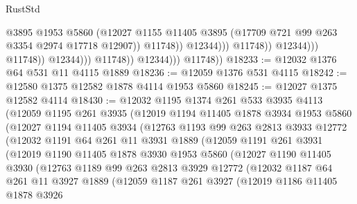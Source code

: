 \begin{lexlean}{RustStd}
\begin{coremodule}
{\begin{coremodule}
{{{{{{{{{{{{{{{{{{{{{{{{{{{{{                                                @3895
                                                @1953
                                                @5860
                                                (@12027
                                                  @1155
                                                  @11405
                                                  @3895
                                                  (@17709 @721 @99 @263 @3354 @2974 @17718 @12907))
                                                @11748))
                                            @12344)))
                                      @11748))
                                  @12344)))
                            @11748))
                        @12344)))
                  @11748))
              @12344)))
        @11748))
@18233 := @12032 @1376 @64 @531 @11 @4115 @1889
@18236 := @12059 @1376 @531 @4115
@18242 := @12580 @1375 @12582 @1878 @4114 @1953 @5860
@18245 := @12027 @1375 @12582 @4114
@18430 := @12032
    @1195
    @1374
    @261
    @533
    @3935
    @4113
    (@12059
      @1195
      @261
      @3935
      (@12019
        @1194
        @11405
        @1878
        @3934
        @1953
        @5860
        (@12027
          @1194
          @11405
          @3934
          (@12763
            @1193
            @99
            @263
            @2813
            @3933
            @12772
            (@12032
              @1191
              @64
              @261
              @11
              @3931
              @1889
              (@12059
                @1191
                @261
                @3931
                (@12019
                  @1190
                  @11405
                  @1878
                  @3930
                  @1953
                  @5860
                  (@12027
                    @1190
                    @11405
                    @3930
                    (@12763
                      @1189
                      @99
                      @263
                      @2813
                      @3929
                      @12772
                      (@12032
                        @1187
                        @64
                        @261
                        @11
                        @3927
                        @1889
                        (@12059
                          @1187
                          @261
                          @3927
                          (@12019
                            @1186
                            @11405
                            @1878
                            @3926
}}}}}}}}}}}}}}}}}}}}}}}}}}}}}
\end{coremodule}}
\end{coremodule}
\end{lexlean}
